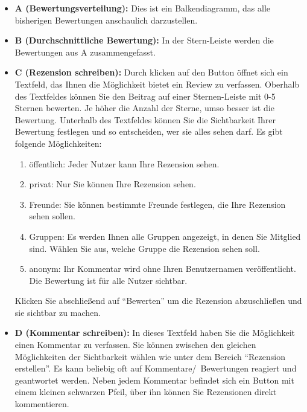 \begin{enumerate}
\begin{itemize}
        \item \textbf{A (Bewertungsverteilung):} Dies ist ein Balkendiagramm, das alle bisherigen Bewertungen anschaulich darzustellen. %
        \item \textbf{B (Durchschnittliche Bewertung):} In der Stern-Leiste  werden die Bewertungen aus A zusammengefasst.
        \item \textbf{C (Rezension schreiben):} Durch klicken auf den Button öffnet sich ein Textfeld, das Ihnen die Möglichkeit bietet ein Review  zu verfassen. Oberhalb des Textfeldes können Sie den Beitrag auf einer Sternen-Leiste mit 0-5 Sternen bewerten. Je höher die Anzahl der Sterne, umso besser ist die Bewertung. Unterhalb des Textfeldes können Sie die Sichtbarkeit Ihrer Bewertung festlegen und so entscheiden, wer sie alles sehen darf. Es gibt folgende Möglichkeiten:
        \begin{enumerate}
            \item öffentlich: Jeder Nutzer kann Ihre Rezension sehen.
            \item privat: Nur Sie können Ihre Rezension sehen.
            \item Freunde: Sie können bestimmte Freunde festlegen, die Ihre Rezension sehen sollen.
            \item Gruppen: Es werden Ihnen alle Gruppen angezeigt, in denen Sie Mitglied sind. Wählen Sie aus, welche Gruppe die Rezension sehen soll.
            \item anonym: Ihr Kommentar wird ohne Ihren Benutzernamen veröffentlicht. Die Bewertung ist für alle Nutzer sichtbar.
        \end{enumerate}
       	Klicken Sie abschließend auf \enquote{Bewerten} um die Rezension abzuschließen und sie sichtbar zu machen.
        \item \textbf{D (Kommentar schreiben):} In dieses Textfeld haben Sie die Möglichkeit einen Kommentar zu verfassen. Sie können zwischen den gleichen Möglichkeiten der Sichtbarkeit wählen wie unter dem Bereich \enquote{Rezension erstellen}.
\newline Es kann beliebig oft auf Kommentare/~Bewertungen reagiert und geantwortet werden. Neben jedem Kommentar befindet sich ein Button mit einem kleinen schwarzen Pfeil, über ihn können Sie Rezensionen direkt kommentieren. 
    \end{itemize}
\end{enumerate}